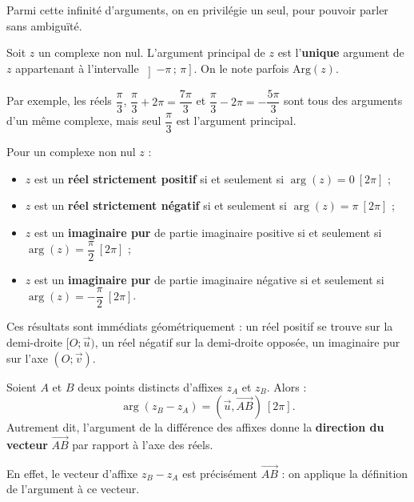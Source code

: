 \documentclass[11pt]{article}
\newcommand{\cle}[1]{{\popxbold\color{popdark}#1}}
\begin{document}
Parmi cette infinité d'arguments, on en privilégie un seul, pour pouvoir parler sans ambiguïté.

\begin{definition}
Soit $z$ un complexe non nul. L'\cle{argument principal} de $z$ est l'\textbf{unique} argument de $z$ appartenant à l'intervalle $\left]-\pi\,;\,\pi\right]$. On le note parfois $\mathrm{Arg}(z)$.
\end{definition}

Par exemple, les réels $\dfrac{\pi}{3}$, $\dfrac{\pi}{3} + 2\pi = \dfrac{7\pi}{3}$ et $\dfrac{\pi}{3} - 2\pi = -\dfrac{5\pi}{3}$ sont tous des arguments d'un même complexe, mais seul $\dfrac{\pi}{3}$ est l'argument principal.

\begin{propriete}
Pour un complexe non nul $z$ :
\begin{itemize}
\item $z$ est un \textbf{réel strictement positif} si et seulement si $\arg(z) = 0 \ [2\pi]$ ;
\item $z$ est un \textbf{réel strictement négatif} si et seulement si $\arg(z) = \pi \ [2\pi]$ ;
\item $z$ est un \textbf{imaginaire pur} de partie imaginaire positive si et seulement si $\arg(z) = \dfrac{\pi}{2} \ [2\pi]$ ;
\item $z$ est un \textbf{imaginaire pur} de partie imaginaire négative si et seulement si $\arg(z) = -\dfrac{\pi}{2} \ [2\pi]$.
\end{itemize}
\end{propriete}

Ces résultats sont immédiats géométriquement : un réel positif se trouve sur la demi-droite $[O;\vec{u})$, un réel négatif sur la demi-droite opposée, un imaginaire pur sur l'axe $(O;\vec{v})$.

\begin{propriete}
Soient $A$ et $B$ deux points distincts d'affixes $z_A$ et $z_B$. Alors :
\[ \arg(z_B - z_A) = (\vec{u},\overrightarrow{AB}) \ [2\pi]. \]
Autrement dit, l'argument de la différence des affixes donne la \textbf{direction du vecteur} $\overrightarrow{AB}$ par rapport à l'axe des réels.
\end{propriete}

En effet, le vecteur d'affixe $z_B - z_A$ est précisément $\overrightarrow{AB}$ : on applique la définition de l'argument à ce vecteur.
\end{document}
